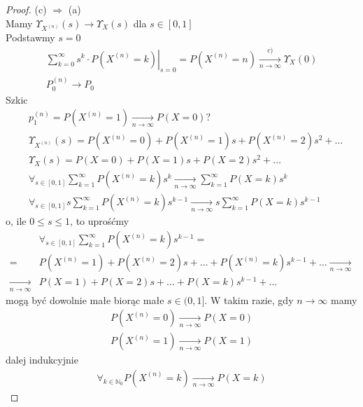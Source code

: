\begin{proof}
(c) $ \Rightarrow $ (a)\\
Mamy $ \Upsilon_{X^{(n)}}(s)\to\Upsilon_X(s) $ dla $ s\in[0,1] $\\
Podstawmy $ s=0 $
\begin{gather*}
\left.\sum_{k=0}^{\infty }s^k\cdot P\left(X^{(n)}=k\right)\right|_{s=0}=P\left(X^{(n)}=n\right)\xrightarrow[n\to \infty ]{c)}\Upsilon_X(0)\\
P_0^{(n)}\to P_0
\end{gather*}
Szkic
\begin{align*}
&p_1^{(n)}=P\left(X^{(n)}=1\right)\xrightarrow[n\to \infty ]{}P\left(X=0\right)?\\
&\Upsilon_{X^{(n)}}(s)=P\left(X^{(n)}=0\right)+P\left(X^{(n)}=1\right)s+P\left(X^{(n)}=2\right)s^2+\dots\\
&\Upsilon_{X}(s)=P\left(X=0\right)+P\left(X=1\right)s+P\left(X=2\right)s^2+\dots\\
&\forall_{s\in[0,1]}\sum_{k=1}^{\infty }P\left(X^{(n)}=k\right)s^k\xrightarrow[n\to \infty ]{}\sum_{k=1}^{\infty }P\left(X=k\right)s^k\\
&\forall_{s\in[0,1]}s\sum_{k=1}^{\infty }P\left(X^{(n)}=k\right)s^{k-1}\xrightarrow[n\to \infty ]{}s\sum_{k=1}^{\infty }P\left(X=k\right)s^{k-1}
\end{align*}
o, ile $ 0\le s\le1 $, to uprośćmy
\begin{align*}
&\forall_{s\in[0,1]}\sum_{k=1}^{\infty }P\left(X^{(n)}=k\right)s^{k-1}
=\\=&
P\left(X^{(n)}=1\right)+P\left(X^{(n)}=2\right)s+\dots+P\left(X^{(n)}=k\right)s^{k-1}+\dots 
\xrightarrow[n\to \infty ]{}\\
\xrightarrow[n\to \infty ]{}&
P\left(X=1\right)+P\left(X=2\right)s+\dots+P\left(X=k\right)s^{k-1}+\dots 
\end{align*}
mogą być dowolnie małe biorąc małe $ s\in (0,1] $. W takim razie, gdy $ n\to \infty  $ mamy
\begin{gather*}
P\left(X^{(n)}=0\right)\xrightarrow[n\to \infty ]{}P\left(X=0\right)\\
P\left(X^{(n)}=1\right)\xrightarrow[n\to \infty ]{}P\left(X=1\right)
\end{gather*}
dalej indukcyjnie
\begin{gather*}
\forall_{k\in \mathbb N _0}P\left(X^{(n)}=k\right)\xrightarrow[n\to \infty ]{}P\left(X=k\right)
\end{gather*}
\end{proof}
